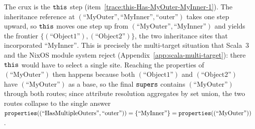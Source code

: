 \begin{remark}
  The crux is the $\mathtt{this}$ step (item~\ref{trace:this-Has-MyOuter-MyInner-1}).
  The inheritance reference at
  $(\text{``MyOuter''}, \text{``MyInner''}, \text{``outer''})$ takes one step
  upward, so $\mathtt{this}$ moves one step up from
  $(\text{``MyOuter''}, \text{``MyInner''})$ and yields the frontier
  $\{(\text{``Object1''}), (\text{``Object2''})\}$, the two inheritance
  sites that incorporated $\text{``MyInner''}$. This is precisely the
  multi-target situation that Scala~3 and the NixOS module system reject
  (Appendix~\ref{app:scala-multi-target}): there $\mathtt{this}$ would have to
  select a single site. Reaching the properties of $(\text{``MyOuter''})$
  then happens because both $(\text{``Object1''})$ and
  $(\text{``Object2''})$ have $(\text{``MyOuter''})$ as a base, so the final
  $\mathtt{supers}$ contains $(\text{``MyOuter''})$ through both routes; since
  attribute resolution aggregates by set union, the two routes collapse to
  the single answer
  $\mathtt{properties}((\text{``HasMultipleOuters''}, \text{``outer''}))
  = \{\text{``MyInner''}\} = \mathtt{properties}((\text{``MyOuter''}))$.
\end{remark}

\fi %





